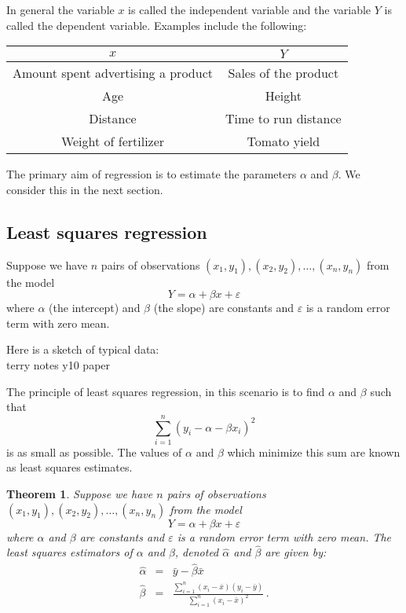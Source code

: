 \documentclass[12pt]{article}
\theoremstyle{break}
\newtheorem{theorem}{Theorem}[section]
\begin{document}
In general the variable $x$ is called the independent variable and the variable $Y$ is called the dependent variable. Examples include the following:
\begin{center}
\begin{tabular}{|c|c|}
  \hline
  $x$ & $Y$ \\ \hline
  Amount spent advertising a product& Sales of the product \\
  Age & Height \\
  Distance & Time to run distance \\
  Weight of fertilizer & Tomato yield  \\
  \hline
\end{tabular}
\end{center}

The primary aim of regression is to estimate the parameters $\alpha$ and $\beta$. We consider this in the next section.

\subsection{Least squares regression}
Suppose we have $n$ pairs of observations $(x_{1},y_{1}),(x_{2},y_{2}),\dots,(x_{n},y_{n})$  from the model $$Y=\alpha+\beta x +\varepsilon$$
where $\alpha$ (the intercept) and $\beta$ (the slope) are constants and $\varepsilon$ is a random error term with zero mean.



\begin{mdframed}
{Here is a sketch of typical data:}\\
\textcolor[rgb]{1.00,1.00,1.00}{terry notes y10 paper\lipsum[1-3]}
\end{mdframed}

The principle of least squares regression, in this scenario is to find $\alpha$ and $\beta$ such that $$\sum_{i=1}^{n}(y_{i}-\alpha-\beta x_{i})^{2}$$ is as small as possible. The values of $\alpha$ and $\beta$ which minimize this sum are known as least squares estimates.

\begin{theorem}\label{th_reg}
Suppose we have $n$ pairs of observations $(x_{1},y_{1}),(x_{2},y_{2}),\dots,(x_{n},y_{n})$  from the model $$Y=\alpha+\beta x +\varepsilon$$
where $\alpha$ and $\beta$ are constants and $\varepsilon$ is a random error term with zero mean. The least squares estimators of $\alpha$ and $\beta$, denoted $\hat{\alpha}$ and $\hat{\beta}$ are given by:
\begin{eqnarray*}
  \hat{\alpha} &=& \bar{y}-\hat{\beta}\bar{x} \\
  \hat{\beta} &=& \frac{\sum_{i=1}^{n}(x_{i}-\bar{x})(y_{i}-\bar{y})}{\sum_{i=1}^{n}(x_{i}-\bar{x})^{2}}\, .
\end{eqnarray*}
\end{theorem}
\end{document}
